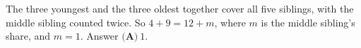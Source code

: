 The three youngest and the three oldest together cover all five siblings, with the middle sibling counted twice. So $4+9=12+m$, where $m$ is the middle sibling's share, and $m=1$. Answer $\boxed{\textbf{(A)}\ 1}$.
